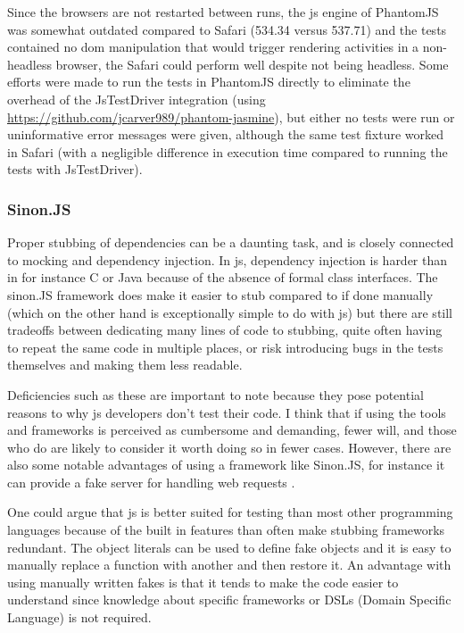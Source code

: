 \documentclass[11pt]{article}
\begin{document}
Since the browsers are not restarted between runs, the \gls{js} engine of PhantomJS was somewhat outdated compared to Safari (534.34 versus 537.71) and the tests contained no dom manipulation that would trigger rendering activities in a non-headless browser, the Safari could perform well despite not being headless. Some efforts were made to run the tests in PhantomJS directly to eliminate the overhead of the JsTestDriver integration (using \url{https://github.com/jcarver989/phantom-jasmine}), but either no tests were run or uninformative error messages were given, although the same test fixture worked in Safari (with a negligible difference in execution time compared to running the tests with JsTestDriver).

\subsubsection{Sinon.JS}

Proper stubbing of dependencies can be a daunting task, and is closely connected to mocking and dependency injection. In \gls{js}, dependency injection is harder than in for instance C or Java because of the absence of formal class interfaces. The sinon.JS framework does make it easier to stub compared to if done manually (which on the other hand is exceptionally simple to do with \gls{js}) but there are still tradeoffs between dedicating many lines of code to stubbing, quite often having to repeat the same code in multiple places, or risk introducing bugs in the tests themselves and making them less readable.

Deficiencies such as these are important to note because they pose potential reasons to why \gls{js} developers don't test their code. I think that if using the tools and frameworks is perceived as cumbersome and demanding, fewer will, and those who do are likely to consider it worth doing so in fewer cases. However, there are also some notable advantages of using a framework like Sinon.JS, for instance it can provide a fake server for handling web requests \cite{TestingStatistics2}.

One could argue that \gls{js} is better suited for testing than most other programming languages because of the built in features than often make stubbing frameworks redundant. The object literals can be used to define fake objects and it is easy to manually replace a function with another and then restore it. An advantage with using manually written fakes is that it tends to make the code easier to understand since knowledge about specific frameworks or DSLs (Domain Specific Language) is not required. \cite[questions~20-21]{Edelstam}\label{LiteralFakes}
\end{document}
